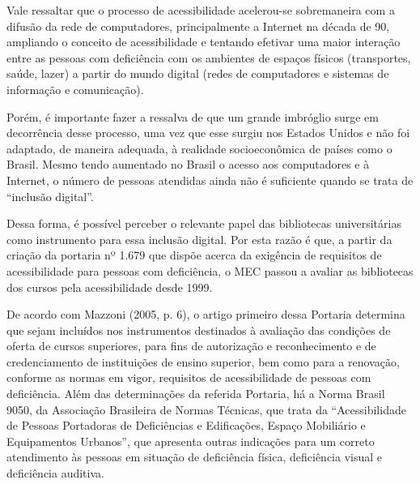 

	Vale ressaltar que o processo de acessibilidade acelerou-se sobremaneira com a difusão da rede de computadores, principalmente a Internet na década de 90, ampliando o conceito de acessibilidade e tentando efetivar uma maior interação entre as pessoas com deficiência com os ambientes de espaços físicos (transportes, saúde, lazer) a partir do mundo digital (redes de computadores e sistemas de informação e comunicação).

	Porém, é importante fazer a ressalva de que um grande imbróglio surge em decorrência desse processo, uma vez que esse surgiu nos Estados Unidos e não foi adaptado, de maneira adequada, à realidade socioeconômica de países como o Brasil. Mesmo tendo aumentado no Brasil o acesso aos computadores e à Internet, o número de pessoas atendidas ainda não é suficiente quando se trata de ``inclusão digital''.

	Dessa forma, é possível perceber o relevante papel das bibliotecas universitárias como instrumento para essa inclusão digital. Por esta razão é que, a partir da criação da portaria nº 1.679 que dispõe acerca da exigência de requisitos de acessibilidade para pessoas com deficiência, o MEC passou a avaliar as bibliotecas dos cursos pela acessibilidade desde 1999.

	De acordo com Mazzoni (2005, p. 6), o artigo primeiro dessa Portaria determina que sejam incluídos nos instrumentos destinados à avaliação das condições de oferta de cursos superiores, para fins de autorização e reconhecimento e de credenciamento de instituições de ensino superior, bem como para a renovação, conforme as normas em vigor, requisitos de acessibilidade de pessoas com deficiência. Além das determinações da referida Portaria, há a Norma Brasil 9050, da Associação Brasileira de Normas Técnicas, que trata da “Acessibilidade de Pessoas Portadoras de Deficiências e Edificações, Espaço Mobiliário e Equipamentos Urbanos”, que apresenta outras indicações para um correto atendimento às pessoas em situação de deficiência física, deficiência visual e deficiência auditiva.

